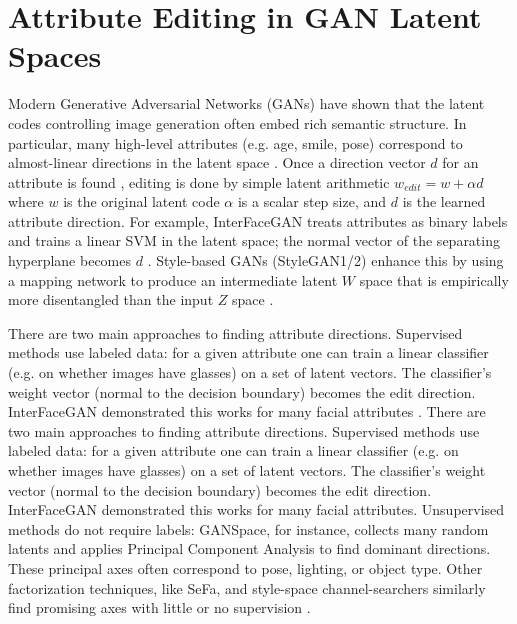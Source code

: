 \section{Attribute Editing in GAN Latent Spaces}

Modern Generative Adversarial Networks (GANs) have shown that the latent codes controlling image generation often embed rich semantic structure. 
In particular, many high-level attributes (e.g. age, smile, pose) correspond to almost-linear directions in the latent space \citep{shen2020interpretinglatentspacegans,härkönen2020ganspacediscoveringinterpretablegan}.
Once a direction vector $d$ for an attribute is found , editing is done by simple latent arithmetic $w_{edit} = w+\alpha d$
where $w$ is the original latent code $\alpha$ is a scalar step size, and $d$ is the learned attribute direction.
For example, InterFaceGAN treats attributes as binary labels and trains a linear SVM in the latent space; the normal vector of the separating hyperplane becomes $d$ \citep{shen2020interpretinglatentspacegans}. 
Style-based GANs (StyleGAN1/2) enhance this by using a mapping network to produce an intermediate latent 
$W$ space that is empirically more disentangled than the input 
$Z$ space \citep{karras2020analyzingimprovingimagequality,wu2020stylespaceanalysisdisentangledcontrols}.

There are two main approaches to finding attribute directions. 
Supervised methods use labeled data: for a given attribute one can train a linear classifier 
(e.g. on whether images have glasses) on a set of latent vectors. The classifier's weight vector 
(normal to the decision boundary) becomes the edit direction. InterFaceGAN demonstrated this works for many facial attributes \citep{shen2020interpretinglatentspacegans}.
There are two main approaches to finding attribute directions. Supervised methods use labeled data: for a given attribute one can train a linear classifier 
(e.g. on whether images have glasses) on a set of latent vectors. The classifier's weight vector (normal to the decision boundary) becomes the edit direction. InterFaceGAN demonstrated this works for many facial attributes.
Unsupervised methods do not require labels: GANSpace, for instance, collects many random latents and applies Principal Component Analysis to find dominant directions.
These principal axes often correspond to pose, lighting, or object type. Other factorization techniques, like SeFa, and style-space channel-searchers similarly find promising axes with little or no supervision \citep{shen2020interpretinglatentspacegans,härkönen2020ganspacediscoveringinterpretablegan,shen2021closedformfactorizationlatentsemantics}.

